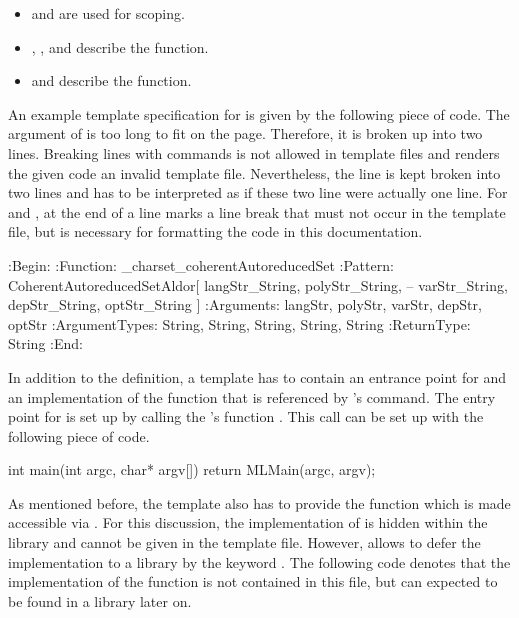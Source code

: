 \begin{itemize}
\item {} and  are used for scoping.
\item {}, , and  describe the \C function.
\item {} and  describe the \MathLink function.
\end{itemize}

An example template specification for \exportedsymbol is given by the following piece of code. The argument of  is too long to fit on the page. Therefore, it is broken up into two lines. Breaking lines with \MathLink commands is not allowed in \MathLink template files and renders the given code an invalid \MathLink template file. Nevertheless, the line is kept broken into two lines and has to be interpreted as if these two line were actually one line. For  and , \mathematicacode{--} at the end of a line marks a line break that must not occur in the \MathLink template file, but is necessary for formatting the code in this documentation.

\begin{mathematicaprogram}
:Begin:
:Function:      _charset_coherentAutoreducedSet
:Pattern:       CoherentAutoreducedSetAldor[ langStr_String, polyStr_String,      --
  varStr_String, depStr_String, optStr_String ]
:Arguments:     { langStr, polyStr, varStr, depStr, optStr }
:ArgumentTypes: { String, String, String, String, String }
:ReturnType:    String
:End:
\end{mathematicaprogram}

In addition to the \MathLink definition, a \MathLink template has to contain an entrance point for \MathLink and an implementation of the \C function that is referenced by \MathLink's  command. The entry point for \Mathematica is set up by calling the \MathLink's \C function . This call can be set up with the following piece of code.

\begin{mathematicaprogram}
int main(int argc, char* argv[])
{
  return MLMain(argc, argv);
}
\end{mathematicaprogram}

As mentioned before, the \MathLink template also has to provide the \C function which is made accessible via \MathLink. For this discussion, the implementation of \exportedsymbol is hidden within the \LibCharSet library and cannot be given in the template file. However, \C allows to defer the implementation to a library by the keyword . The following \C code denotes that the implementation of the function \exportedsymbol is not contained in this file, but can expected to be found in a library later on.

